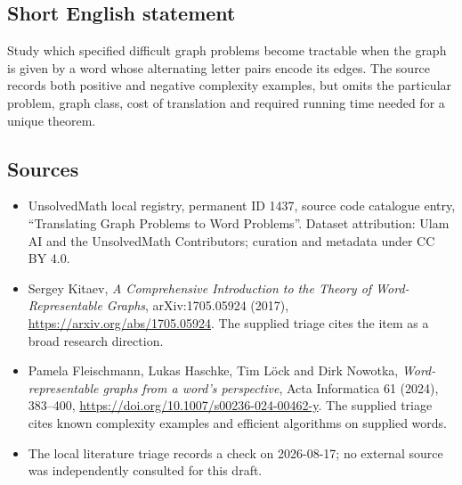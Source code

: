 \documentclass[11pt]{article}
\begin{document}
\subsection{Short English statement}
Study which specified difficult graph problems become tractable when the graph is given by a word whose alternating letter pairs encode its edges. The source records both positive and negative complexity examples, but omits the particular problem, graph class, cost of translation and required running time needed for a unique theorem.
\subsection{Sources}
\begin{itemize}
\item UnsolvedMath local registry, permanent ID 1437, source code catalogue entry, ``Translating Graph Problems to Word Problems''. Dataset attribution: Ulam AI and the UnsolvedMath Contributors; curation and metadata under CC BY 4.0.
\item Sergey Kitaev, \emph{A Comprehensive Introduction to the Theory of Word-Representable Graphs}, arXiv:1705.05924 (2017), \url{https://arxiv.org/abs/1705.05924}. The supplied triage cites the item as a broad research direction.
\item Pamela Fleischmann, Lukas Haschke, Tim Löck and Dirk Nowotka, \emph{Word-representable graphs from a word's perspective}, Acta Informatica 61 (2024), 383--400, \url{https://doi.org/10.1007/s00236-024-00462-y}. The supplied triage cites known complexity examples and efficient algorithms on supplied words.
\item The local literature triage records a check on 2026-08-17; no external source was independently consulted for this draft.
\end{itemize}
\end{document}
